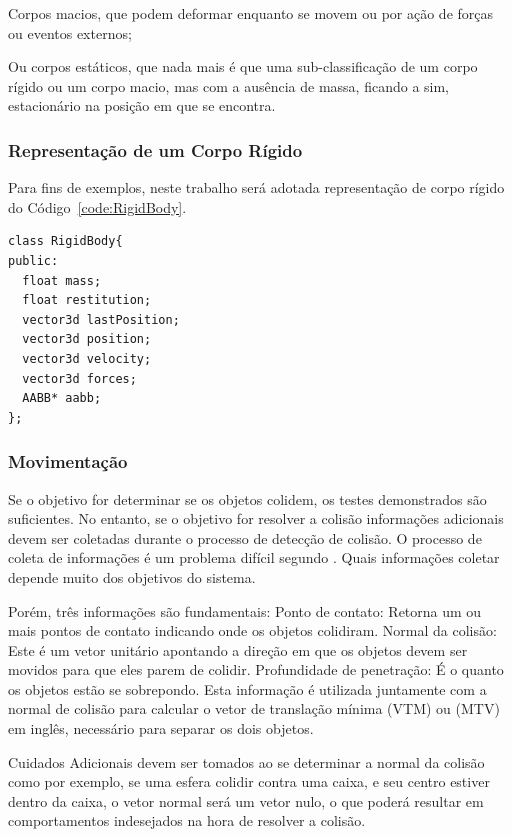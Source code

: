 Corpos macios, que podem deformar enquanto se movem ou por ação de forças ou eventos externos;

Ou corpos estáticos, que nada mais é que uma sub-classificação de um corpo rígido ou um corpo macio,  mas com a ausência de massa, ficando a sim, estacionário na posição em que se
encontra.

\subsubsection{Representação de um Corpo Rígido}

Para fins de exemplos, neste trabalho será adotada representação de corpo rígido do Código~\ref{code:RigidBody}.

\begin{lstlisting}[frame=single,caption=Exemplo de corpo rígido\label{code:RigidBody}]
class RigidBody{
public:
  float mass;
  float restitution;
  vector3d lastPosition;
  vector3d position;
  vector3d velocity;
  vector3d forces;
  AABB* aabb;
};
\end{lstlisting}

\subsubsection{Movimentação}

Se o objetivo for determinar  se os objetos colidem, os testes demonstrados são
suficientes. No entanto, se o objetivo for resolver a colisão informações adicionais devem
ser coletadas durante o processo de detecção de colisão. O processo de coleta
de informações é um problema difícil segundo .
Quais informações coletar depende muito dos objetivos do sistema.

Porém, três informações são fundamentais:
Ponto de contato: Retorna um ou mais pontos de contato indicando onde os objetos colidiram.
Normal da colisão: Este é um vetor unitário apontando a direção em que os objetos devem ser movidos para que eles parem de colidir.
Profundidade de penetração: É o quanto os objetos estão se sobrepondo. Esta
informação é utilizada juntamente com a normal de colisão para calcular o vetor
de translação mínima (VTM) ou (MTV) em inglês, necessário para separar os dois
objetos.

Cuidados Adicionais devem ser tomados ao se determinar a normal da colisão como
por exemplo, se uma esfera colidir contra uma caixa, e seu centro estiver
dentro da caixa, o vetor normal será um vetor nulo, o que poderá resultar em
comportamentos indesejados na hora de resolver a colisão.

